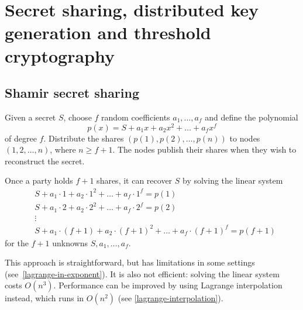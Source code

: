 \chapter{Secret sharing, distributed key generation and threshold cryptography}
\section{Shamir secret sharing}
Given a secret $S$, choose $f$ random coefficients $a_1,\dots,a_f$ and define the polynomial
\[p(x) = S + a_1 x + a_2 x^2 + \dots + a_f x^f\]
of degree $f$. Distribute the shares $(p(1), p(2), \dots, p(n))$ to nodes $(1, 2, \dots, n)$, where $n \ge f+1$.
The nodes publish their shares when they wish to reconstruct the secret.

Once a party holds $f+1$ shares, it can recover $S$ by solving the linear system
\begin{align*}
  & S + a_1\cdot 1 + a_2\cdot 1^2  + \dots + a_f \cdot 1^f = p(1)\\
  & S + a_1\cdot 2 + a_2\cdot 2^2  + \dots + a_f \cdot 2^f = p(2)\\
  & \vdots \\
  & S + a_1\cdot (f+1) + a_2\cdot (f+1)^2  + \dots + a_f\cdot(f+1)^f = p(f+1)
\end{align*}
for the $f+1$ unknowns $S, a_1, \dots, a_f$.

This approach is straightforward, but has limitations in some settings (see~\ref{lagrange-in-exponent}).
It is also not efficient: solving the linear system costs $O(n^3)$.
Performance can be improved by using Lagrange interpolation instead,
which runs in $O(n^2)$ (see \autoref{lagrange-interpolation}).

